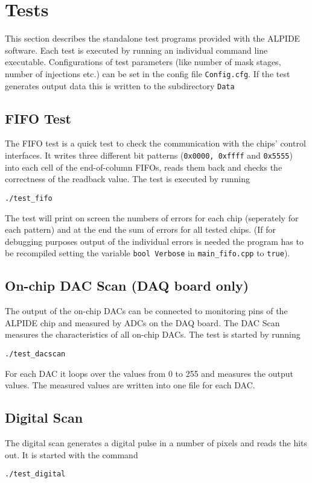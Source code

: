 \documentclass{article}
\begin{document}
\section{Tests}
This section describes the standalone test programs provided with the ALPIDE software. Each test is executed by running an individual command line executable. Configurations of test parameters (like number of mask stages, number of injections etc.) can be set in the config file \texttt{Config.cfg}. If the test generates output data this is written to the subdirectory \texttt{Data}

\subsection{FIFO Test}
The FIFO test is a quick test to check the communication with the
chips' control interfaces. It writes three different bit patterns (\texttt{0x0000, 0xffff} and
\texttt{0x5555}) into each cell of the
end-of-column FIFOs, reads them back and checks the correctness of the
readback value. The test is executed by running
\begin{verbatim}
./test_fifo
\end{verbatim}

The test will print on screen the numbers of errors for each chip (seperately for each pattern) and at the end the sum of errors for all tested chips. 
(If for debugging purposes output of the individual errors is needed the program has to be recompiled setting the variable \texttt{bool Verbose} in \texttt{main\_fifo.cpp} to \texttt{true}).

\subsection {On-chip DAC Scan (DAQ board only)}
The output of the on-chip DACs can be connected to monitoring pins of
the ALPIDE chip and measured by ADCs on the DAQ board. The DAC Scan measures the characteristics of all on-chip DACs. The test is started by running 
\begin{verbatim}
./test_dacscan
\end{verbatim}
For each DAC it loops over the values from 0 to 255 and measures the
output values. The measured values are written into one file for each
DAC.

\subsection{Digital Scan} 
The digital scan generates a digital pulse in a number of pixels and
reads the hits out. It is started with the command
\begin{verbatim}
./test_digital
\end{verbatim}
\end{document}

